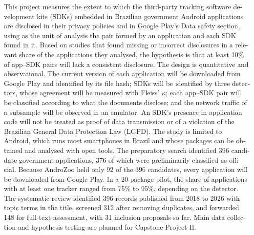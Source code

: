 \begin{otherlanguage}{english}
\noindent This project measures the extent to which the third-party tracking software development kits (SDKs) embedded in Brazilian government Android applications are disclosed in their privacy policies and in Google Play's Data safety section, using as the unit of analysis the pair formed by an application and each SDK found in it. Based on studies that found missing or incorrect disclosures in a relevant share of the applications they analysed, the hypothesis is that at least 10\% of app--SDK pairs will lack a consistent disclosure. The design is quantitative and observational. The current version of each application will be downloaded from Google Play and identified by its file hash; SDKs will be identified by three detectors, whose agreement will be measured with Fleiss' $\kappa$; each app--SDK pair will be classified according to what the documents disclose; and the network traffic of a subsample will be observed in an emulator. An SDK's presence in application code will not be treated as proof of data transmission or of a violation of the Brazilian General Data Protection Law (LGPD). The study is limited to Android, which runs most smartphones in Brazil and whose packages can be obtained and analysed with open tools. The preparatory search identified 396 candidate government applications, 376 of which were preliminarily classified as official. Because AndroZoo held only 92 of the 396 candidates, every application will be downloaded from Google Play. In a 20-package pilot, the share of applications with at least one tracker ranged from 75\% to 95\%, depending on the detector. The systematic review identified 396 records published from 2018 to 2026 with topic terms in the title, screened 312 after removing duplicates, and forwarded 148 for full-text assessment, with 31 inclusion proposals so far. Main data collection and hypothesis testing are planned for Capstone Project II.

\end{otherlanguage}
